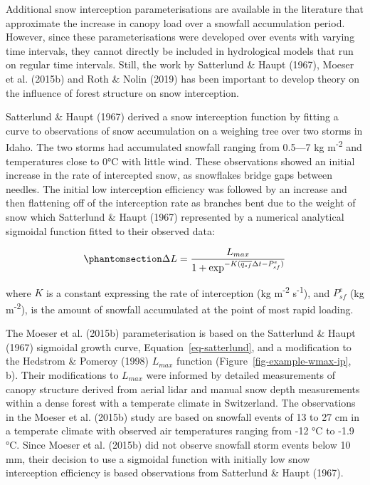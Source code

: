 \documentclass[
  letterpaper,
]{tex/uofsthesis-cs}
\begin{document}
Additional snow interception parameterisations are available in the
literature that approximate the increase in canopy load over a snowfall
accumulation period. However, since these parameterisations were
developed over events with varying time intervals, they cannot directly
be included in hydrological models that run on regular time intervals.
Still, the work by Satterlund \& Haupt (1967), Moeser et al. (2015b) and
Roth \& Nolin (2019) has been important to develop theory on the
influence of forest structure on snow interception.

Satterlund \& Haupt (1967) derived a snow interception function by
fitting a curve to observations of snow accumulation on a weighing tree
over two storms in Idaho. The two storms had accumulated snowfall
ranging from 0.5---7 kg m\textsuperscript{-2} and temperatures close to
0°C with little wind. These observations showed an initial increase in
the rate of intercepted snow, as snowflakes bridge gaps between needles.
The initial low interception efficiency was followed by an increase and
then flattening off of the interception rate as branches bent due to the
weight of snow which Satterlund \& Haupt (1967) represented by a
numerical analytical sigmoidal function fitted to their observed data:

\begin{equation}\phantomsection\label{eq-satterlund}{
\Delta L = \frac{L_{max}}{1+\text{exp}^{-K(\overline{q_{sf}} \Delta t-P_{sf}^e)}}
}\end{equation}

where \(K\) is a constant expressing the rate of interception (kg
m\textsuperscript{-2} s\textsuperscript{-1}), and \(P_{sf}^e\) (kg
m\textsuperscript{-2}), is the amount of snowfall accumulated at the
point of most rapid loading.

The Moeser et al. (2015b) parameterisation is based on the Satterlund \&
Haupt (1967) sigmoidal growth curve, Equation~\ref{eq-satterlund}, and a
modification to the Hedstrom \& Pomeroy (1998) \(L_{max}\) function
(Figure~\ref{fig-example-wmax-ip}, b). Their modifications to
\(L_{max}\) were informed by detailed measurements of canopy structure
derived from aerial lidar and manual snow depth measurements within a
dense forest with a temperate climate in Switzerland. The observations
in the Moeser et al. (2015b) study are based on snowfall events of 13 to
27 cm in a temperate climate with observed air temperatures ranging from
-12 °C to -1.9 °C. Since Moeser et al. (2015b) did not observe snowfall
storm events below 10 mm, their decision to use a sigmoidal function
with initially low snow interception efficiency is based observations
from Satterlund \& Haupt (1967).
\end{document}
